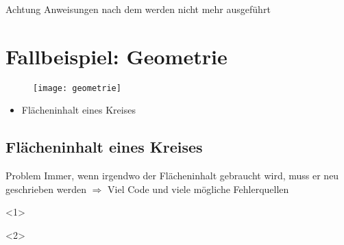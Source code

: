 \begin{frame}
	\slidehead

	\begin{block}{Achtung}
		Anweisungen nach dem  werden nicht mehr ausgeführt
	\end{block}
\end{frame}

\livecoding

\section{Fallbeispiel: Geometrie}
\begin{frame}
	\slidehead

	\begin{figure}
		\centering
		\texttt{[image: geometrie]}
	\end{figure}
	\vspace{-10mm}
	\begin{itemize}
		\item Flächeninhalt eines Kreises
	\end{itemize}
\end{frame}

\subsection{Flächeninhalt eines Kreises}
\begin{frame}
	\slidehead

	\begin{block}{Problem}
		Immer, wenn irgendwo der Flächeninhalt gebraucht wird, muss er neu geschrieben werden $\Rightarrow$ Viel Code und viele mögliche Fehlerquellen
	\end{block}
\end{frame}

\begin{frame}
	\slidehead

	\begin{onlyenv}
	\end{onlyenv}

	\begin{onlyenv}
	\end{onlyenv}

\end{frame}


